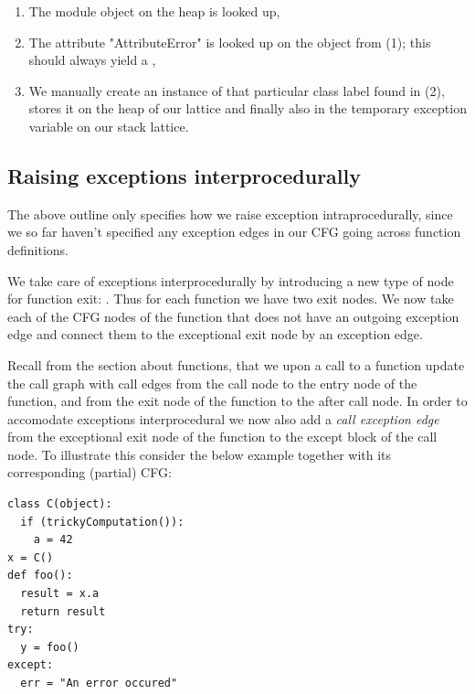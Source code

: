 \begin{enumerate}
	\item The  module object on the heap is looked up,
	\item The attribute "AttributeError" is looked up on the  object from (1); this should always yield a ,
	\item We manually create an instance of that particular class label found in (2), stores it on the heap of our lattice and finally also in the temporary exception variable on our stack lattice.
\end{enumerate}


\subsection{Raising exceptions interprocedurally}
The above outline only specifies how we raise exception intraprocedurally, since we so far haven't specified any exception edges in our CFG going across function definitions.

We take care of exceptions interprocedurally by introducing a new type of node for function exit: . Thus for each function we have two exit nodes. We now take each of the CFG nodes of the function that does not have an outgoing exception edge and connect them to the exceptional exit node by an exception edge.

Recall from the section about functions, that we upon a call to a function update the call graph with call edges from the call node to the entry node of the function, and from the exit node of the function to the after call node. In order to accomodate exceptions interprocedural we now also add a \textit{call exception edge} from the exceptional exit node of the function to the except block of the call node. To illustrate this consider the below example together with its corresponding (partial) CFG:

\begin{listing}[H]
	\begin{verbatim}
class C(object):
  if (trickyComputation()):
    a = 42
x = C()
def foo():
  result = x.a
  return result
try:
  y = foo()
except:
  err = "An error occured"
	\end{verbatim}
\end{listing}

